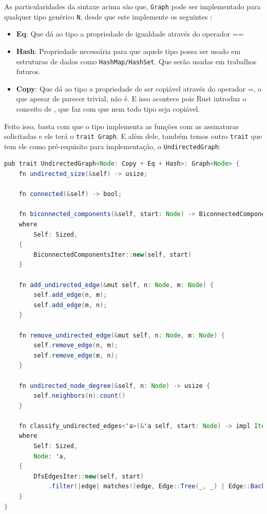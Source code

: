 As particularidades da sintaxe acima são que, \texttt{Graph} pode ser implementado para qualquer tipo genérico \texttt{N}, desde que este implemente os seguintes :

\begin{itemize}
  \item \textbf{Eq}: Que dá ao tipo a propriedade de igualdade através do operador ==
  \item \textbf{Hash}: Propriedade necessária para que aquele tipo possa ser usado em estruturas de dados como \texttt{HashMap/HashSet}. Que serão usadas em trabalhos futuros.
  \item \textbf{Copy}: Que dá ao tipo a propriedade de ser copiável através do operador =, o que apesar de parecer trivial, não é. E isso acontece pois Rust introduz o conceito de \cite{ownership}, que faz com que nem todo tipo seja copiável.
\end{itemize}

Feito isso, basta com que o tipo implementa as funções com as assinaturas solicitadas e ele terá o \texttt{trait Graph}. E além dele, também temos outro \texttt{trait} que tem ele como pré-requisito para implementação, o \texttt{UndirectedGraph}:

\begin{lstlisting}[language=Java, caption={Implementação do trait UndirectedGraph}, label=list:trait_undirected_graph]
pub trait UndirectedGraph<Node: Copy + Eq + Hash>: Graph<Node> {
    fn undirected_size(&self) -> usize;

    fn connected(&self) -> bool;

    fn biconnected_components(&self, start: Node) -> BiconnectedComponentsIter<'_, Node, Self>
    where
        Self: Sized,
    {
        BiconnectedComponentsIter::new(self, start)
    }

    fn add_undirected_edge(&mut self, n: Node, m: Node) {
        self.add_edge(n, m);
        self.add_edge(m, n);
    }

    fn remove_undirected_edge(&mut self, n: Node, m: Node) {
        self.remove_edge(n, m);
        self.remove_edge(m, n);
    }

    fn undirected_node_degree(&self, n: Node) -> usize {
        self.neighbors(n).count()
    }

    fn classify_undirected_edges<'a>(&'a self, start: Node) -> impl Iterator<Item = Edge<Node>>
    where
        Self: Sized,
        Node: 'a,
    {
        DfsEdgesIter::new(self, start)
            .filter(|edge| matches!(edge, Edge::Tree(_, _) | Edge::Back(_, _)))
    }
}
\end{lstlisting}

